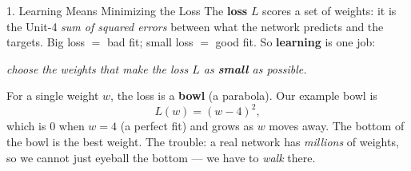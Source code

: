 \documentclass[10pt]{article}
\begin{document}
\begin{notesbox}{1. Learning Means Minimizing the Loss}
The \textbf{loss} $L$ scores a set of weights: it is the Unit-4 \emph{sum of squared errors} between what the
network predicts and the targets. Big loss $=$ bad fit; small loss $=$ good fit. So \textbf{learning} is one
job:
\begin{center}
\emph{choose the weights that make the loss $L$ as \textbf{small} as possible.}
\end{center}
For a single weight $w$, the loss is a \textbf{bowl} (a parabola). Our example bowl is
\[
  L(w)=(w-4)^2,
\]
which is $0$ when $w=4$ (a perfect fit) and grows as $w$ moves away. The bottom of the bowl is the best
weight. The trouble: a real network has \emph{millions} of weights, so we cannot just eyeball the bottom --- we
have to \emph{walk} there.
\end{notesbox}
\end{document}
